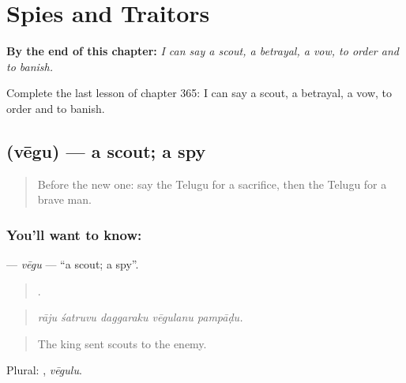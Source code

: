 
\chapter{Spies and Traitors}
\label{ch:te-spies-and-traitors}

\begin{chapteropening}
\textbf{By the end of this chapter:} \emph{I can say a scout, a betrayal, a vow, to order and to banish.}

Complete the last lesson of chapter 365: I can say a scout, a betrayal, a vow, to order and to banish.
\end{chapteropening}

\section[\texorpdfstring{\te{వేగు} (vēgu)}{వేగు (vēgu)}]{ (vēgu) — a scout; a spy}

\label{lesson:TE-C365-vegu}



\begin{quote}
Before the new one: say the Telugu for a sacrifice, then the Telugu for a brave man.
\end{quote}

\subsection*{You'll want to know: }
\textbf{} — \emph{vēgu} — \textquotedblleft{}a scout; a spy\textquotedblright{}.

\begin{quote}
    .
\end{quote}

\begin{quote}
\emph{rāju śatruvu daggaraku vēgulanu pampāḍu.}
\end{quote}

\begin{quote}
The king sent scouts to the enemy.
\end{quote}

Plural: , \emph{vēgulu}.

